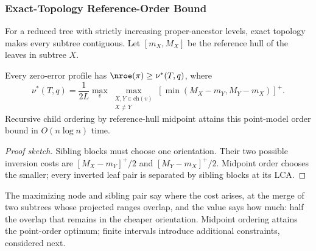 \subsubsection{Exact-Topology Reference-Order Bound}
For a reduced tree with strictly increasing proper-ancestor levels, exact topology makes every subtree contiguous. Let $[m_X,M_X]$ be the reference hull of the leaves in subtree $X$.
\begin{theorem}\label{thm:order}
Every zero-error profile has $\nroe(\pi)\ge\nu^*(T,q)$, where
\begin{equation}\label{eq:nu}
 \nu^*(T,q)=\frac{1}{2L}\max_v\max_{\substack{X,Y\in\mathrm{ch}(v)\\X\ne Y}}
 [\min(M_X-m_Y,M_Y-m_X)]^+.
\end{equation}
Recursive child ordering by reference-hull midpoint attains this point-model order bound in $O(n\log n)$ time.
\end{theorem}
\begin{proof}[Proof sketch]
Sibling blocks must choose one orientation. Their two possible inversion costs are $[M_X-m_Y]^+/2$ and $[M_Y-m_X]^+/2$. Midpoint order chooses the smaller; every inverted leaf pair is separated by sibling blocks at its LCA.
\end{proof}
The maximizing node and sibling pair say where the cost arises, at the merge of two subtrees whose projected ranges overlap, and the value says how much: half the overlap that remains in the cheaper orientation. Midpoint ordering attains the point-order optimum; finite intervals introduce additional constraints, considered next.

